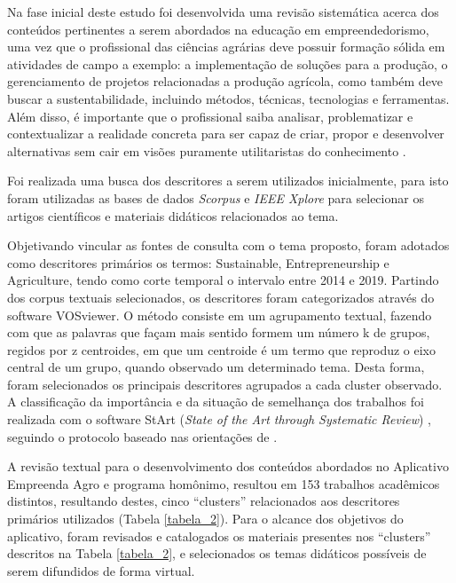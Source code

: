 Na fase inicial deste estudo foi desenvolvida uma revisão sistemática acerca dos conteúdos pertinentes a serem abordados na educação em empreendedorismo, uma vez que o profissional das ciências agrárias deve possuir formação sólida em atividades de campo a exemplo: a implementação de soluções para a produção, o gerenciamento de projetos relacionadas a produção agrícola, como também deve buscar a sustentabilidade, incluindo métodos, técnicas, tecnologias e ferramentas. Além disso, é importante que o profissional saiba analisar, problematizar e contextualizar a realidade concreta para ser capaz de criar, propor e desenvolver alternativas sem cair em visões puramente utilitaristas do conhecimento \cite{cavalcanti_da_2019}.

Foi realizada uma busca dos descritores a serem utilizados inicialmente, para isto foram utilizadas as bases de dados \textit{Scorpus} e \textit{IEEE Xplore} para selecionar os artigos científicos e materiais didáticos relacionados ao tema.

Objetivando vincular as fontes de consulta com o tema proposto, foram adotados como descritores primários os termos: Sustainable, Entrepreneurship e Agriculture, tendo como corte temporal o intervalo entre 2014 e 2019. Partindo dos corpus textuais selecionados, os descritores foram categorizados através do software VOSviewer. O método consiste em um agrupamento textual, fazendo com que as palavras que façam mais sentido formem um número k de grupos, regidos por z centroides, em que um centroide é um termo que reproduz o eixo central de um grupo, quando observado um determinado tema. Desta forma, foram selecionados os principais descritores agrupados a cada cluster observado. A classificação da importância e da situação de semelhança dos trabalhos foi realizada com o software StArt (\textit{State of the Art through Systematic Review}) \cite{lapes_start_2005}, seguindo o protocolo baseado nas orientações de . 

A revisão textual para o desenvolvimento dos conteúdos abordados no Aplicativo Empreenda Agro e programa homônimo, resultou em 153 trabalhos acadêmicos distintos, resultando destes, cinco “clusters” relacionados aos descritores primários utilizados (Tabela \ref{tabela_2}). Para o alcance dos objetivos do aplicativo, foram revisados e catalogados os materiais presentes nos “clusters” descritos na Tabela \ref{tabela_2}, e selecionados os temas didáticos possíveis de serem difundidos de forma virtual.



